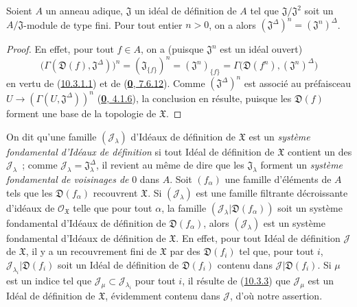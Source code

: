 \begin{proposition}[10.3.6]
\label{I.10.3.6-fr}
Soient $A$ un anneau adique, $\mathfrak{J}$ un idéal de définition de $A$
tel que $\mathfrak{J}/\mathfrak{J}^2$ soit un
$A/\mathfrak{J}$-module de type fini. Pour tout entier $n>0$, on a alors
$(\mathfrak{J}^\Delta)^n=(\mathfrak{J}^n)^\Delta$.
\end{proposition}

\begin{proof}
En effet, pour tout $f\in A$, on a (puisque $\mathfrak{J}^n$ est un idéal
ouvert)
\[
  \bigl(\Gamma(\mathfrak{D}(f),\mathfrak{J}^\Delta)\bigr)^n
  =(\mathfrak{J}_{\{f\}})^n
  =(\mathfrak{J}^n)_{\{f\}}
  =\Gamma\bigl(\mathfrak{D}(f^n),(\mathfrak{J}^n)^\Delta\bigr)
\]
en vertu de (\hyperref[I.10.3.1.1-fr]{10.3.1.1}) et de
(\hyperref[0.7.6.12-fr]{\textbf{0}, 7.6.12}). Comme
$(\mathfrak{J}^\Delta)^n$ est associé au préfaisceau
$U\to(\Gamma(U,\mathfrak{J}^\Delta))^n$
(\hyperref[0.4.1.6-fr]{\textbf{0}, 4.1.6}), la conclusion en résulte, puisque les
$\mathfrak{D}(f)$ forment une base de la topologie de $\mathfrak{X}$.
\end{proof}

\begin{env}[10.3.7]
\label{I.10.3.7-fr}
On dit qu'une famille $(\mathscr{J}_\lambda)$ d'Idéaux de définition de
$\mathfrak{X}$ est un \emph{système fondamental d'Idéaux de définition}
si tout Idéal de définition de $\mathfrak{X}$ contient un des
$\mathscr{J}_\lambda$~; comme
$\mathscr{J}_\lambda=\mathfrak{J}_\lambda^\Delta$, il revient au même de
dire que les $\mathfrak{J}_\lambda$ forment un \emph{système fondamental
de voisinages de} 0 dans $A$. Soit $(f_\alpha)$ une famille d'éléments de
$A$ tels que les $\mathfrak{D}(f_\alpha)$ recouvrent $\mathfrak{X}$. Si
$(\mathscr{J}_\lambda)$ est une famille filtrante décroissante d'idéaux de
$\mathscr{O}_{\mathfrak{X}}$ telle que pour tout $\alpha$, la famille
$(\mathscr{J}_\lambda|\mathfrak{D}(f_\alpha))$ soit un système fondamental
d'Idéaux de définition de $\mathfrak{D}(f_\alpha)$, alors
$(\mathscr{J}_\lambda)$ est un système fondamental d'Idéaux de définition
de $\mathfrak{X}$. En effet, pour tout Idéal de définition $\mathscr{J}$
de $\mathfrak{X}$, il y a un recouvrement fini de $\mathfrak{X}$ par des
$\mathfrak{D}(f_i)$ tel que, pour tout $i$,
$\mathscr{J}_{\lambda_i}|\mathfrak{D}(f_i)$ soit un Idéal de définition
de $\mathfrak{D}(f_i)$ contenu dans
$\mathscr{J}|\mathfrak{D}(f_i)$. Si $\mu$ est un indice tel que
$\mathscr{J}_\mu\subset\mathscr{J}_{\lambda_i}$ pour tout $i$, il résulte
de (\hyperref[I.10.3.3-fr]{10.3.3}) que $\mathscr{J}_\mu$ est un Idéal de
définition de $\mathfrak{X}$, évidemment contenu dans $\mathscr{J}$, d'où
notre assertion.
\end{env}

